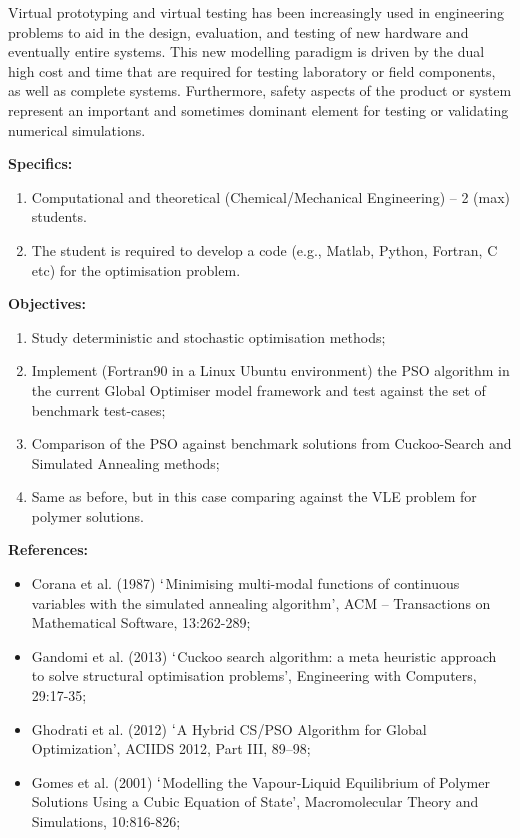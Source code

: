 \documentclass[12pts,a4paper,amsmath,amssymb,floatfix]{article}%
\begin{document}
\begin{enumerate}[label=\bfseries Project \arabic*:]
Virtual prototyping and virtual testing has been increasingly used in engineering problems to aid in the design, evaluation, and testing of new hardware and eventually entire systems. This new modelling paradigm is driven by the dual high cost and time that are required for testing laboratory or field components, as well as complete systems. Furthermore, safety aspects of the product or system represent an important and sometimes dominant element for testing or validating numerical simulations.


\noindent
{\bf Specifics:} 
\begin{enumerate}
\item Computational and theoretical (Chemical/Mechanical Engineering) -- 2 (max) students. 
\item The student is required to develop a code (e.g., Matlab, Python, Fortran, C etc) for the optimisation problem.
\end{enumerate} 



\noindent
{\bf Objectives:}
\begin{enumerate}
\item Study deterministic and stochastic optimisation methods;
\item Implement (Fortran90 in a Linux Ubuntu environment) the PSO algorithm in the current Global Optimiser model framework and test against the set of benchmark test-cases;
\item Comparison of the PSO against benchmark solutions from Cuckoo-Search and Simulated Annealing methods;
\item Same as before, but in this case comparing against the VLE problem for polymer solutions.  
\end{enumerate}


\noindent
{\bf References:}
\begin{itemize}
\item Corana et al. (1987) $\lq$Minimising multi-modal functions of continuous variables with the simulated annealing algorithm', ACM -- Transactions on Mathematical Software, 13:262-289;
\item Gandomi et al. (2013) $\lq$Cuckoo search algorithm: a meta heuristic approach to solve structural optimisation problems', Engineering with Computers, 29:17-35;
\item Ghodrati et al. (2012) $\lq$A Hybrid CS/PSO Algorithm for Global Optimization', ACIIDS 2012, Part III, 89–98;
\item Gomes et al. (2001) $\lq$Modelling the Vapour-Liquid Equilibrium of Polymer Solutions Using a Cubic Equation of State', Macromolecular Theory and Simulations, 10:816-826;
\end{itemize}


\end{enumerate}
\end{document}
